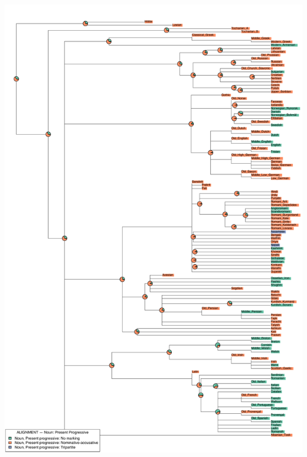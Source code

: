 \includegraphics[width=.9\linewidth]{supp-graphics/ALIGNMENTNounPresentProgressiveNPROGOSoALIGNMENTNounPresentProgressiveNPROGAOALIGNMENTNounPresentProgressiveNPROGASaALIGNMENTNounPresentProgressiveNPROGSaSo.pdf}


